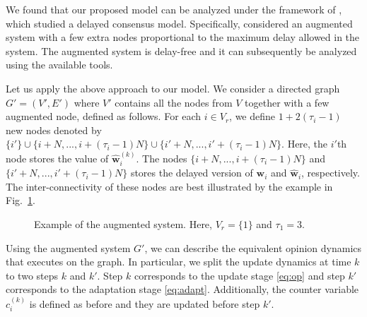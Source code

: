 \documentclass[letter]{article}
\theoremstyle{remark}
\begin{document}
We found that our proposed model can be analyzed under the framework of \cite{}, which studied a delayed consensus model. Specifically, \cite{} considered an augmented system with a few extra nodes proportional to the maximum delay allowed in the system. The augmented system is delay-free and it can subsequently be analyzed using the available tools. 

Let us apply the above approach to our model. We consider a directed graph $G' = (V',E')$ where $V'$ contains all the nodes from $V$ together with a few augmented node, defined as follows. For each $i \in V_r$, we define $1 + 2(\tau_i - 1)$ new nodes denoted by $\{ i' \} \cup \{i + N, ..., i + (\tau_i-1)N\} \cup \{ i'+N, ..., i' + (\tau_i-1)N\}$. Here, the $i'$th node stores the value of $\hat{\bm w}_i^{(k)}$. The nodes $\{i + N, ..., i + (\tau_i-1)N\}$ and $\{ i'+N, ..., i' + (\tau_i-1)N\}$ stores the delayed version of ${\bm w}_i$ and $\hat{\bm w}_i$, respectively. The inter-connectivity of these nodes are best illustrated by the example in Fig.~\ref{fig:augment}. 

\begin{figure}[t]
\centerline{
}
\caption{Example of the augmented system. Here, $V_r = \{1\}$ and $\tau_1 = 3$. 
} \label{fig:augment}
\end{figure}

Using the augmented system $G'$, we can describe the equivalent opinion dynamics that executes on the graph. In particular, we split the update dynamics at time $k$ to two steps $k$ and $k'$. Step $k$ corresponds to the update stage \eqref{eq:op} and step $k'$ corresponds to the adaptation stage \eqref{eq:adapt}. 
Additionally, the counter variable $c_i^{(k)}$ is defined as before and they are updated before step $k'$. 
\end{document}

